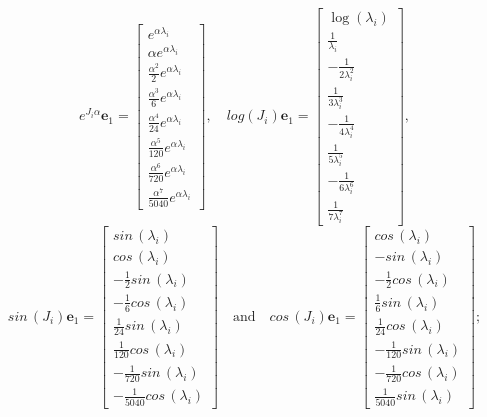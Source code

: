 \begin{displaymath}
e^{J_{i} \alpha} \boldsymbol{e}_{1} = \left[\begin{matrix}e^{\alpha \lambda_{i}}\\\alpha e^{\alpha \lambda_{i}}\\\frac{\alpha^{2}}{2} e^{\alpha \lambda_{i}}\\\frac{\alpha^{3}}{6} e^{\alpha \lambda_{i}}\\\frac{\alpha^{4}}{24} e^{\alpha \lambda_{i}}\\\frac{\alpha^{5}}{120} e^{\alpha \lambda_{i}}\\\frac{\alpha^{6}}{720} e^{\alpha \lambda_{i}}\\\frac{\alpha^{7}}{5040} e^{\alpha \lambda_{i}}\end{matrix}\right], \quad
log{\left (J_{i} \right )} \boldsymbol{e}_{1} = \left[\begin{matrix}\log{\left (\lambda_{i} \right )}\\\frac{1}{\lambda_{i}}\\- \frac{1}{2 \lambda_{i}^{2}}\\\frac{1}{3 \lambda_{i}^{3}}\\- \frac{1}{4 \lambda_{i}^{4}}\\\frac{1}{5 \lambda_{i}^{5}}\\- \frac{1}{6 \lambda_{i}^{6}}\\\frac{1}{7 \lambda_{i}^{7}}\end{matrix}\right],
\end{displaymath}
\begin{displaymath}
sin\,{\left (J_{i} \right )} \boldsymbol{e}_{1} = \left[\begin{matrix}sin\,{\left (\lambda_{i} \right )}\\cos\,{\left (\lambda_{i} \right )}\\- \frac{1}{2} sin\,{\left (\lambda_{i} \right )}\\- \frac{1}{6} cos\,{\left (\lambda_{i} \right )}\\\frac{1}{24} sin\,{\left (\lambda_{i} \right )}\\\frac{1}{120} cos\,{\left (\lambda_{i} \right )}\\- \frac{1}{720} sin\,{\left (\lambda_{i} \right )}\\- \frac{1}{5040} cos\,{\left (\lambda_{i} \right )}\end{matrix}\right]
\quad\text{and}\quad
cos\,{\left (J_{i} \right )} \boldsymbol{e}_{1} = \left[\begin{matrix}cos\,{\left (\lambda_{i} \right )}\\- sin\,{\left (\lambda_{i} \right )}\\- \frac{1}{2} cos\,{\left (\lambda_{i} \right )}\\\frac{1}{6} sin\,{\left (\lambda_{i} \right )}\\\frac{1}{24} cos\,{\left (\lambda_{i} \right )}\\- \frac{1}{120} sin\,{\left (\lambda_{i} \right )}\\- \frac{1}{720} cos\,{\left (\lambda_{i} \right )}\\\frac{1}{5040} sin\,{\left (\lambda_{i} \right )}\end{matrix}\right];
\end{displaymath}
